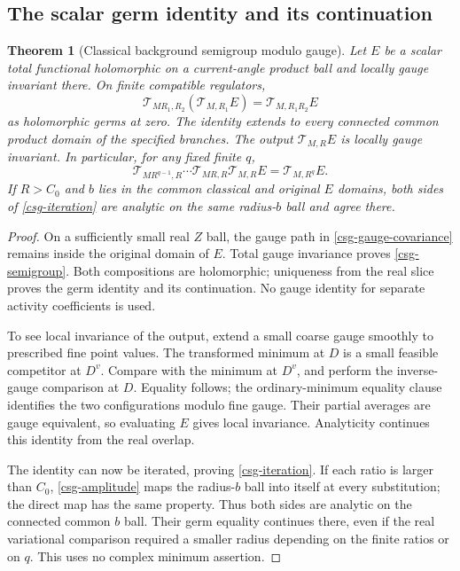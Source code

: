 \documentclass[11pt]{article}
\newtheorem{theorem}{Theorem}[section]
\theoremstyle{remark}
\begin{document}
\subsection{The scalar germ identity and its continuation}
\label{csg-identity-section}

\begin{theorem}[Classical background semigroup modulo gauge]
\label{csg-theorem}
Let $E$ be a scalar total functional holomorphic on a
current-angle product ball and locally gauge invariant
there. On finite compatible regulators,
\begin{equation}
 \mathcal T_{MR_1,R_2}(\mathcal T_{M,R_1}E)
                   =\mathcal T_{M,R_1R_2}E
 \label{csg-semigroup}
\end{equation}
as holomorphic germs at zero. The identity extends to every
connected common product domain of the specified branches.
The output $\mathcal T_{M,R}E$ is locally gauge invariant.
In particular, for any fixed finite $q$,
\begin{equation}
 \mathcal T_{MR^{q-1},R}\cdots
 \mathcal T_{MR,R}\mathcal T_{M,R}E
                         =\mathcal T_{M,R^q}E.
 \label{csg-iteration}
\end{equation}
If $R>C_0$ and $b$ lies in the common classical and original
$E$ domains, both sides of \eqref{csg-iteration} are
analytic on the same radius-$b$ ball and agree there.
\end{theorem}
\begin{proof}
On a sufficiently small real $Z$ ball, the gauge path in
\eqref{csg-gauge-covariance} remains inside the original
domain of $E$. Total gauge invariance proves
\eqref{csg-semigroup}. Both compositions are holomorphic;
uniqueness from the real slice proves the germ identity
and its continuation. No gauge identity for separate
activity coefficients is used.

To see local invariance of the output, extend a small
coarse gauge smoothly to prescribed fine point values.
The transformed minimum at $D$ is a small feasible
competitor at $D^v$. Compare with the minimum at $D^v$,
and perform the inverse-gauge comparison at $D$.
Equality follows; the ordinary-minimum equality clause
identifies the two configurations modulo fine gauge.
Their partial averages are gauge equivalent, so evaluating
$E$ gives local invariance. Analyticity continues this
identity from the real overlap.

The identity can now be iterated, proving
\eqref{csg-iteration}. If each ratio is larger than $C_0$,
\eqref{csg-amplitude} maps the radius-$b$ ball into itself
at every substitution; the direct map has the same
property. Thus both sides are analytic on the connected
common $b$ ball. Their germ equality continues there,
even if the real variational comparison required a
smaller radius depending on the finite ratios or on $q$.
This uses no complex minimum assertion.
\end{proof}
\end{document}
